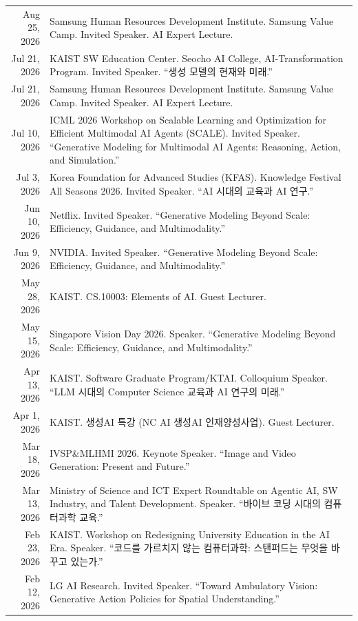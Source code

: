 \documentclass[letterpaper,10pt]{article} %
\begin{document}
\begin{xltabular}{\textwidth}{r|X}
Aug 25, 2026 & Samsung Human Resources Development Institute. Samsung Value Camp. Invited Speaker. AI Expert Lecture.\\
Jul 21, 2026 & KAIST SW Education Center. Seocho AI College, AI-Transformation Program. Invited Speaker. ``생성 모델의 현재와 미래.''\\
Jul 21, 2026 & Samsung Human Resources Development Institute. Samsung Value Camp. Invited Speaker. AI Expert Lecture.\\
Jul 10, 2026 & ICML 2026 Workshop on Scalable Learning and Optimization for Efficient Multimodal AI Agents (SCALE). Invited Speaker. ``Generative Modeling for Multimodal AI Agents: Reasoning, Action, and Simulation.''\\
Jul 3, 2026 & Korea Foundation for Advanced Studies (KFAS). Knowledge Festival All Seasons 2026. Invited Speaker. ``AI 시대의 교육과 AI 연구.''\\
Jun 10, 2026 & Netflix. Invited Speaker. ``Generative Modeling Beyond Scale: Efficiency, Guidance, and Multimodality.''\\
Jun 9, 2026 & NVIDIA. Invited Speaker. ``Generative Modeling Beyond Scale: Efficiency, Guidance, and Multimodality.''\\
May 28, 2026 & KAIST. CS.10003: Elements of AI. Guest Lecturer.\\
May 15, 2026 & Singapore Vision Day 2026. Speaker. ``Generative Modeling Beyond Scale: Efficiency, Guidance, and Multimodality.''\\
Apr 13, 2026 & KAIST. Software Graduate Program/KTAI. Colloquium Speaker. ``LLM 시대의 Computer Science 교육과 AI 연구의 미래.''\\
Apr 1, 2026 & KAIST. 생성AI 특강 (NC AI 생성AI 인재양성사업). Guest Lecturer.\\
Mar 18, 2026 & IVSP\&MLHMI 2026. Keynote Speaker. ``Image and Video Generation: Present and Future.''\\
Mar 13, 2026 & Ministry of Science and ICT Expert Roundtable on Agentic AI, SW Industry, and Talent Development. Speaker. ``바이브 코딩 시대의 컴퓨터과학 교육.''\\
Feb 23, 2026 & KAIST. Workshop on Redesigning University Education in the AI Era. Speaker. ``코드를 가르치지 않는 컴퓨터과학: 스탠퍼드는 무엇을 바꾸고 있는가.''\\
Feb 12, 2026 & LG AI Research. Invited Speaker. ``Toward Ambulatory Vision: Generative Action Policies for Spatial Understanding.''\\

\end{xltabular}
\end{document}
